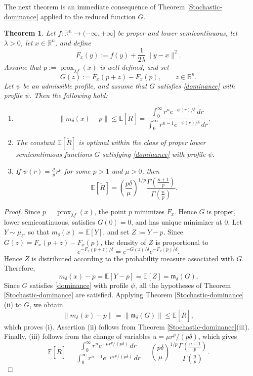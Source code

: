 \documentclass[11pt]{article}
\newcommand{\1}{\mathds{1}}
\newtheorem{theorem}{Theorem}[section]
\theoremstyle{definition}
\theoremstyle{remark}
\theoremstyle{definition}
\begin{document}
The next theorem is an immediate consequence of Theorem \ref{Stochastic-dominance} applied to the reduced function \(G\).
\begin{theorem}\label{general-theorem}
Let \(f\colon \mathbb R^n\to(-\infty,+\infty]\) be proper and lower semicontinuous,
let \(\lambda>0\), let \(x\in\mathbb R^n\), and define
\[
F_x(y):=f(y)+\frac{1}{2\lambda}\|y-x\|^2.
\]
Assume that \(p:=\operatorname{prox}_{\lambda f}(x)\) is well defined, and set
\[
G(z):=F_x(p+z)-F_x(p), \qquad z\in\mathbb R^n.
\]
Let \(\psi\) be an admissible profile, and assume that \(G\) satisfies
\eqref{dominance} with profile \(\psi\). Then the following hold:
\begin{enumerate}
    \item[(i)]
    \[
    \|m_\delta(x)-p\|
    \le
    \mathbb{E}[\widetilde R]
    =
    \frac{\displaystyle\int_0^\infty r^n e^{-\psi(r)/\delta}\,dr}
         {\displaystyle\int_0^\infty r^{n-1} e^{-\psi(r)/\delta}\,dr}.
    \]

    \item[(ii)] The constant \(\mathbb{E}[\widetilde R]\) is optimal within the class
    of proper lower semicontinuous functions \(G\) satisfying \eqref{dominance}
    with profile \(\psi\).

  \item[(iii)] If \(\psi(r)=\frac{\mu}{p}r^p\) for some \(p>1\) and \(\mu>0\), then
\[
\mathbb{E}[\widetilde R]
=
\left(\frac{p\delta}{\mu}\right)^{1/p}
\frac{\Gamma\!\left(\frac{n+1}{p}\right)}
{\Gamma\!\left(\frac{n}{p}\right)}.
\]
\end{enumerate}
\end{theorem}
\begin{proof}
Since \(p=\operatorname{prox}_{\lambda f}(x)\), the point \(p\) minimizes \(F_x\).
Hence \(G\) is proper, lower semicontinuous, satisfies \(G(0)=0\), and has
unique minimizer at \(0\). Let \(Y\sim \mu_\delta\), so that \(m_\delta(x)=\mathbb E[Y]\), and set
\(Z:=Y-p\). Since $G(z)=F_x(p+z)-F_x(p)$, the density of \(Z\) is proportional to
\[
e^{-F_x(p+z)/\delta}=e^{-G(z)/\delta}e^{-F_x(p)/\delta}.
\]
Hence \(Z\) is distributed according to the probability measure associated with \(G\). Therefore,
\[
m_\delta(x)-p=\mathbb E[Y-p]=\mathbb E[Z]=\mathfrak m_\delta(G).
\]
Since \(G\) satisfies \eqref{dominance} with profile \(\psi\), all the
hypotheses of Theorem \ref{Stochastic-dominance} are satisfied. Applying
Theorem \ref{Stochastic-dominance}(ii) to \(G\), we obtain
\[
\|m_\delta(x)-p\|
=
\|\mathfrak m_\delta(G)\|
\le
\mathbb{E}[\widetilde R],
\]
which proves (i). Assertion (ii) follows from Theorem \ref{Stochastic-dominance}(iii). Finally, (iii) follows from the change of variables \(u=\mu r^p/(p\delta)\), which gives
\[
\mathbb{E}[\widetilde R]
=
\frac{\displaystyle\int_0^\infty r^n e^{-\mu r^p/(p\delta)}\,dr}
     {\displaystyle\int_0^\infty r^{n-1} e^{-\mu r^p/(p\delta)}\,dr}
=
\left(\frac{p\delta}{\mu}\right)^{1/p}
\frac{\Gamma\!\left(\frac{n+1}{p}\right)}
     {\Gamma\!\left(\frac{n}{p}\right)}.
\]
\end{proof}
\end{document}
